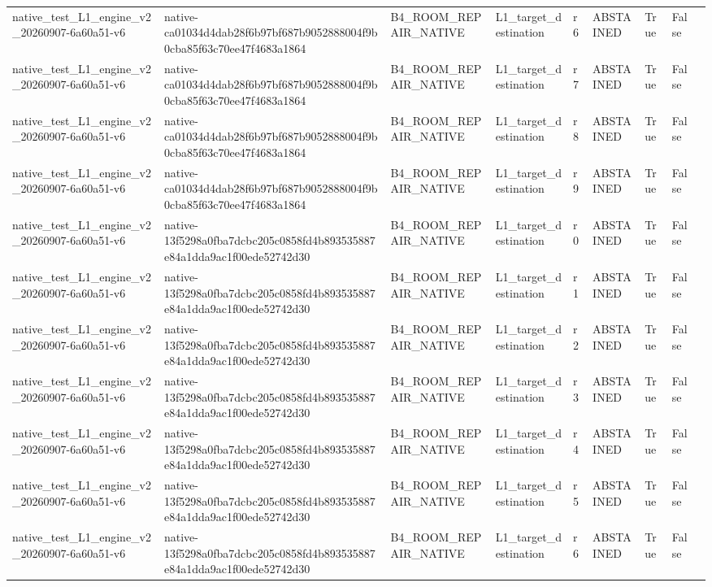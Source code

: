 \begin{tabular}{lllllllll}
native\_test\_L1\_engine\_v2\_20260907-6a60a51-v6 & native-ca01034d4dab28f6b97bf687b9052888004f9b0cba85f63c70ee47f4683a1864 & B4\_ROOM\_REPAIR\_NATIVE & L1\_target\_destination & r6 & ABSTAINED & True & False &  \\
native\_test\_L1\_engine\_v2\_20260907-6a60a51-v6 & native-ca01034d4dab28f6b97bf687b9052888004f9b0cba85f63c70ee47f4683a1864 & B4\_ROOM\_REPAIR\_NATIVE & L1\_target\_destination & r7 & ABSTAINED & True & False &  \\
native\_test\_L1\_engine\_v2\_20260907-6a60a51-v6 & native-ca01034d4dab28f6b97bf687b9052888004f9b0cba85f63c70ee47f4683a1864 & B4\_ROOM\_REPAIR\_NATIVE & L1\_target\_destination & r8 & ABSTAINED & True & False &  \\
native\_test\_L1\_engine\_v2\_20260907-6a60a51-v6 & native-ca01034d4dab28f6b97bf687b9052888004f9b0cba85f63c70ee47f4683a1864 & B4\_ROOM\_REPAIR\_NATIVE & L1\_target\_destination & r9 & ABSTAINED & True & False &  \\
native\_test\_L1\_engine\_v2\_20260907-6a60a51-v6 & native-13f5298a0fba7dcbc205c0858fd4b893535887e84a1dda9ac1f00ede52742d30 & B4\_ROOM\_REPAIR\_NATIVE & L1\_target\_destination & r0 & ABSTAINED & True & False &  \\
native\_test\_L1\_engine\_v2\_20260907-6a60a51-v6 & native-13f5298a0fba7dcbc205c0858fd4b893535887e84a1dda9ac1f00ede52742d30 & B4\_ROOM\_REPAIR\_NATIVE & L1\_target\_destination & r1 & ABSTAINED & True & False &  \\
native\_test\_L1\_engine\_v2\_20260907-6a60a51-v6 & native-13f5298a0fba7dcbc205c0858fd4b893535887e84a1dda9ac1f00ede52742d30 & B4\_ROOM\_REPAIR\_NATIVE & L1\_target\_destination & r2 & ABSTAINED & True & False &  \\
native\_test\_L1\_engine\_v2\_20260907-6a60a51-v6 & native-13f5298a0fba7dcbc205c0858fd4b893535887e84a1dda9ac1f00ede52742d30 & B4\_ROOM\_REPAIR\_NATIVE & L1\_target\_destination & r3 & ABSTAINED & True & False &  \\
native\_test\_L1\_engine\_v2\_20260907-6a60a51-v6 & native-13f5298a0fba7dcbc205c0858fd4b893535887e84a1dda9ac1f00ede52742d30 & B4\_ROOM\_REPAIR\_NATIVE & L1\_target\_destination & r4 & ABSTAINED & True & False &  \\
native\_test\_L1\_engine\_v2\_20260907-6a60a51-v6 & native-13f5298a0fba7dcbc205c0858fd4b893535887e84a1dda9ac1f00ede52742d30 & B4\_ROOM\_REPAIR\_NATIVE & L1\_target\_destination & r5 & ABSTAINED & True & False &  \\
native\_test\_L1\_engine\_v2\_20260907-6a60a51-v6 & native-13f5298a0fba7dcbc205c0858fd4b893535887e84a1dda9ac1f00ede52742d30 & B4\_ROOM\_REPAIR\_NATIVE & L1\_target\_destination & r6 & ABSTAINED & True & False &  \\

\end{tabular}
